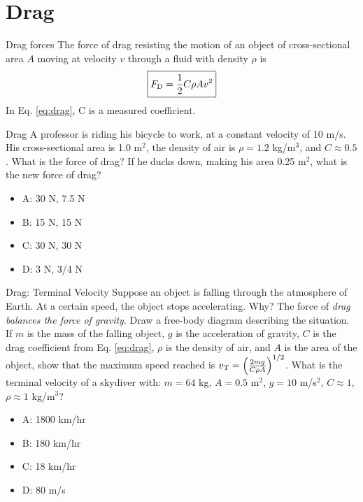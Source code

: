 \documentclass{beamer}
\begin{document}
\section{Drag}

\begin{frame}{Drag forces}
\alert{The force of drag} resisting the motion of an object of cross-sectional area $A$ moving at velocity $v$ through a fluid with density $\rho$ is \\
\begin{equation}
\boxed{F_{\rm D} = \frac{1}{2}C\rho A v^2}
\label{eq:drag}
\end{equation}
In Eq. \ref{eq:drag}, C is a measured coefficient.
\end{frame}

\begin{frame}{Drag}
A professor is riding his bicycle to work, at a constant velocity of 10 m/s.  His cross-sectional area is 1.0 m$^2$, the density of air is $\rho = 1.2$ kg/m$^3$, and $C \approx 0.5$.  What is the force of drag?  If he ducks down, making his area 0.25 m$^2$, what is the new force of drag?
\begin{itemize}
\item A: 30 N, 7.5 N
\item B: 15 N, 15 N
\item C: 30 N, 30 N
\item D: 3 N, 3/4 N
\end{itemize}
\end{frame}

\begin{frame}{Drag: Terminal Velocity}
\small
Suppose an object is falling through the atmosphere of Earth.  At a certain speed, the object stops accelerating.  Why?  The force of \textit{drag balances the force of gravity}.  Draw a free-body diagram describing the situation.  If $m$ is the mass of the falling object, $g$ is the acceleration of gravity, $C$ is the drag coefficient from Eq. \ref{eq:drag}, $\rho$ is the density of air, and $A$ is the area of the object, show that the maximum speed reached is $v_{\rm T} = \left(\frac{2mg}{C\rho A}\right)^{1/2}$.  What is the terminal velocity of a skydiver with: $m = 64$ kg, $A = 0.5$ m$^2$, $g = 10$ m/s$^2$, $C \approx 1$, $\rho \approx 1$ kg/m$^3$?
\begin{itemize}
\item A: 1800 km/hr
\item B: 180 km/hr
\item C: 18 km/hr
\item D: 80 m/s
\end{itemize}
\end{frame}
\end{document}
